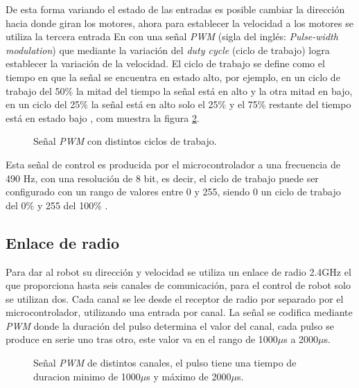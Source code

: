 \documentclass{iccmemoria}
\begin{document}
De esta forma variando el estado de las entradas es posible cambiar la dirección hacia donde giran los motores, ahora para establecer la velocidad a los motores se utiliza la tercera entrada En con una señal \emph{PWM} (sigla del inglés: \emph{Pulse-width modulation}) que mediante la variación del \emph{duty cycle} (ciclo de trabajo) logra establecer la variación de la velocidad. El ciclo de trabajo se define como el tiempo en que la señal se encuentra en estado alto, por ejemplo, en un ciclo de trabajo del 50\% la mitad del tiempo la señal está en alto y la otra mitad en bajo, en un ciclo del 25\% la señal está en alto solo el 25\% y el 75\% restante del tiempo está en estado bajo \cite{barrett2006microcontrollers}, com muestra la figura \ref{fig:pwm}.\\

\begin{figure}[H]
  \centering
  \selectfont{
  
  }
  \caption[Ciclo de trabajo de señal \emph{PWM}]{Señal \emph{PWM} con distintos ciclos de trabajo.}
  \label{fig:pwm}
\end{figure}
 
Esta señal de control es producida por el microcontrolador a una frecuencia de 490 Hz, con una resolución de 8 bit, es decir, el ciclo de trabajo puede ser configurado con un rango de valores entre 0 y 255, siendo 0 un ciclo de trabajo del 0\% y 255 del 100\% \cite{referenceAnalogWrite}.\\

\subsection{Enlace de radio}

Para dar al robot su dirección y velocidad se utiliza un enlace de radio 2.4GHz el que proporciona hasta seis canales de comunicación, para el control de robot solo se utilizan dos. Cada canal se lee desde el receptor de radio por separado por el microcontrolador, utilizando una entrada por canal. La señal se codifica mediante \emph{PWM} donde la duración del pulso determina el valor del canal, cada pulso se produce en serie uno tras otro, este valor va en el rango de 1000$\mu$s a 2000$\mu$s.\\

\begin{figure}[H]
  \centering
  \selectfont{
  
  }
  \caption[Señal \emph{PWM} de los canales de radio.]{Señal \emph{PWM} de distintos canales, el pulso tiene una tiempo de duracion minimo de 1000$\mu$s y máximo de 2000$\mu$s.}
  \label{fig:pwm}
\end{figure}
\end{document}
